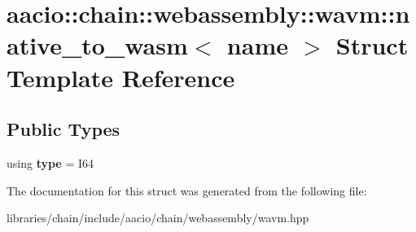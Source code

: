\hypertarget{structaacio_1_1chain_1_1webassembly_1_1wavm_1_1native__to__wasm_3_01name_01_4}{}\section{aacio\+:\+:chain\+:\+:webassembly\+:\+:wavm\+:\+:native\+\_\+to\+\_\+wasm$<$ name $>$ Struct Template Reference}
\label{structaacio_1_1chain_1_1webassembly_1_1wavm_1_1native__to__wasm_3_01name_01_4}
\subsection*{Public Types}
\begin{DoxyCompactItemize}
\item 
\mbox{\label{structaacio_1_1chain_1_1webassembly_1_1wavm_1_1native__to__wasm_3_01name_01_4_abdcfcc4c626946cfb6a19ee492f5c46f}} 
using {\bfseries type} = I64
\end{DoxyCompactItemize}


The documentation for this struct was generated from the following file\+:\begin{DoxyCompactItemize}
\item 
libraries/chain/include/aacio/chain/webassembly/wavm.\+hpp\end{DoxyCompactItemize}
